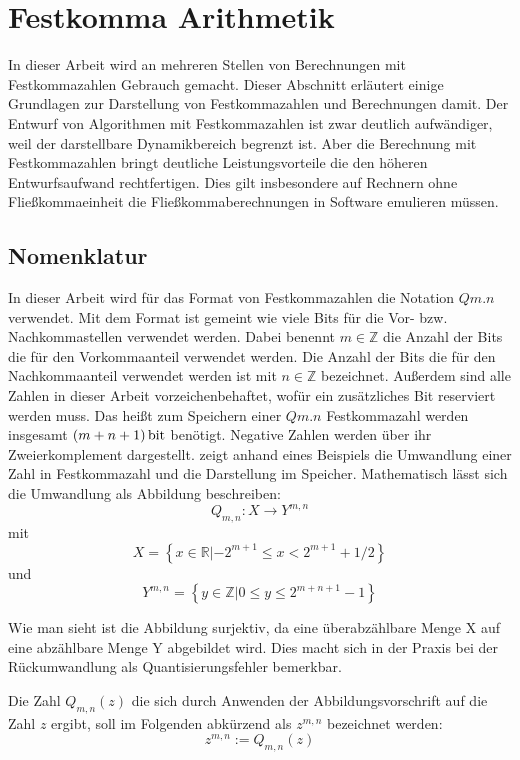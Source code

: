\chapter{Festkomma Arithmetik}
\label{AppendixFestkomma}
In dieser Arbeit wird an mehreren Stellen von Berechnungen mit Festkommazahlen Gebrauch gemacht. Dieser Abschnitt erläutert einige Grundlagen zur Darstellung von Festkommazahlen und Berechnungen damit. Der Entwurf von Algorithmen mit Festkommazahlen ist zwar deutlich aufwändiger, weil der darstellbare Dynamikbereich begrenzt ist. Aber die Berechnung mit Festkommazahlen bringt deutliche Leistungsvorteile die den höheren Entwurfsaufwand rechtfertigen. Dies gilt insbesondere auf Rechnern ohne Fließkommaeinheit die Fließkommaberechnungen in Software emulieren müssen.


\section{Nomenklatur}

In dieser Arbeit wird für das Format von Festkommazahlen die Notation $Qm.n$ verwendet. Mit dem Format ist gemeint wie viele Bits für die Vor- bzw. Nachkommastellen verwendet werden. Dabei benennt $m \in \mathbb{Z}$ die Anzahl der Bits die für den Vorkommaanteil verwendet werden. Die Anzahl der Bits die für den Nachkommaanteil verwendet werden ist mit $n \in \mathbb{Z}$ bezeichnet.
Außerdem sind alle Zahlen in dieser Arbeit vorzeichenbehaftet, wofür ein zusätzliches Bit reserviert werden muss. Das heißt zum Speichern einer $Qm.n$ Festkommazahl werden insgesamt $(m+n+1)\,\si{\bit}$ benötigt. Negative Zahlen werden über ihr Zweierkomplement dargestellt.  zeigt anhand eines Beispiels die Umwandlung einer Zahl in Festkommazahl und die Darstellung im Speicher.
Mathematisch lässt sich die Umwandlung als Abbildung beschreiben: 
\[Q_{m,n}: X \rightarrow Y^{m,n}\] 
mit \[X =\left\{x \in \mathbb{R}| -2^{m+1}\leq x<2^{m+1}+1/2\right\}\] und \[Y^{m,n} =\left\{y \in \mathbb{Z} | 0 \leq y \leq 2^{m+n+1}-1\right\}\]

Wie man sieht ist die Abbildung surjektiv, da eine überabzählbare Menge X auf eine abzählbare Menge Y abgebildet wird. Dies macht sich in der Praxis bei der Rückumwandlung als Quantisierungsfehler bemerkbar.

Die Zahl $Q_{m,n}(z)$ die sich durch Anwenden der Abbildungsvorschrift auf die Zahl $z$ ergibt, soll im Folgenden abkürzend als $z^{m,n}$ bezeichnet werden:
\[z^{m,n}:=Q_{m,n}(z)\]

